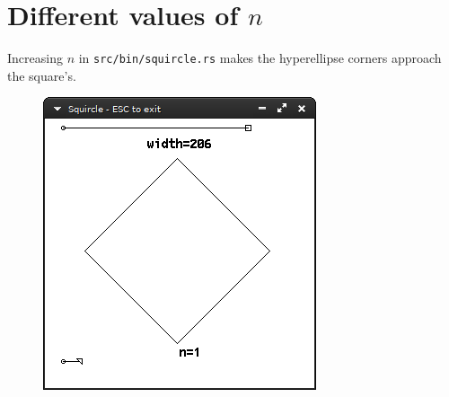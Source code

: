 \documentclass[12pt,openany,a4,usenames,dvipsnames]{book}
\begin{document}
\section*{Different values of $n$}
Increasing $n$ in \texttt{src/bin/squircle.rs} makes the hyperellipse corners approach the square's.
\begin{figure}[H]
  \centering
  \begin{minipage}{0.49\textwidth}
    \includegraphics[width=\textwidth,keepaspectratio]{figures/squircle_1.png}
  \end{minipage}
  \hspace{.1em}
  \begin{minipage}{0.49\textwidth}

\end{minipage}
\end{figure}
\end{document}
